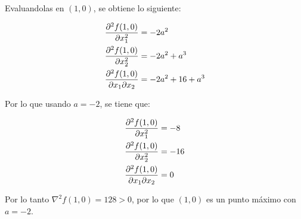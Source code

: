 Evaluandolas en $(1,0)$, se obtiene lo siguiente:

\begin{align*}
    \frac{\partial^2 f(1,0)}{\partial x_1^2}              & = -2a^2          \\
    \frac{\partial^2 f(1,0)}{\partial x_2^2}              & = -2a^2+ a^3     \\
    \frac{\partial ^2f(1,0)}{\partial x_1\partial x_2} & = - 2a^2 +16+a^3
\end{align*}

Por lo que usando $a=-2$, se tiene que:

\begin{align*}
    \frac{\partial^2 f(1,0)}{\partial x_1^2}              & = -8  \\
    \frac{\partial^2 f(1,0)}{\partial x_2^2}              & = -16 \\
    \frac{\partial ^2f(1,0)}{\partial x_1\partial x_2} & = 0
\end{align*}

Por lo tanto $\nabla^2 f(1,0) = 128 > 0$, por lo que $(1,0)$ es un punto máximo con $a=-2$.
